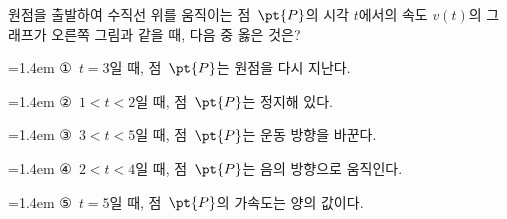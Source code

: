 \noindent\begin{minipage}[t]{0.58\linewidth}\vspace{0pt}\raggedright 원점을 출발하여 수직선 위를 움직이는 점~$\pt{P}$의 시각 $t$에서의 속도 $v(t)$의 그래프가 오른쪽 그림과 같을 때, 다음 중 옳은 것은?\end{minipage}\hfill\begin{minipage}[t]{0.4\linewidth}\vspace{0pt}\centering \resizebox{\ifdim\width>\linewidth\linewidth\else\width\fi}{!}{}\end{minipage}\par
\par\medskip\par\noindent\hangindent=1.4em {\small ①}\ $t=3$일 때, 점~$\pt{P}$는 원점을 다시 지난다.\par\noindent\hangindent=1.4em {\small ②}\ $1<t<2$일 때, 점~$\pt{P}$는 정지해 있다.\par\noindent\hangindent=1.4em {\small ③}\ $3<t<5$일 때, 점~$\pt{P}$는 운동 방향을 바꾼다.\par\noindent\hangindent=1.4em {\small ④}\ $2<t<4$일 때, 점~$\pt{P}$는 음의 방향으로 움직인다.\par\noindent\hangindent=1.4em {\small ⑤}\ $t=5$일 때, 점~$\pt{P}$의 가속도는 양의 값이다.\par\medskip
